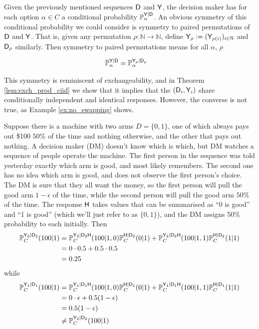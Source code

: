 Given the previously mentioned sequences $\mathsf{D}$ and $\mathsf{Y}$, the decision maker has for each option $\alpha\in C$ a conditional probability $\mathbb{P}_\alpha^{\mathsf{Y}|\mathsf{D}}$. An obvious symmetry of this conditional probability we could consider is symmetry to paired permutations of $\mathsf{D}$ and $\mathsf{Y}$. That is, given any permutation $\rho:\mathbb{N}\to \mathbb{N}$, define $\mathsf{Y}_\rho:=(\mathsf{Y}_{\rho(i)})_{i\in\mathbb{N}}$ and $\mathsf{D}_{\rho}$ similarly. Then symmetry to paired permutations means for all $\alpha$, $\rho$

\begin{align}
    \mathbb{P}_\alpha^{\mathsf{Y}|\mathsf{D}} &= \mathbb{P}_\alpha^{\mathsf{Y}_\rho|\mathsf{D}_\rho}
\end{align}

This symmetry is reminiscent of exchangeability, and in Theorem \ref{lem:exch_prod_ciid} we show that it implies that the $(\mathsf{D}_i,\mathsf{Y}_i)$ share conditionally independent and identical responses. However, the converse is not true, as Example \ref{ex:no_swapping} shows.

\begin{example}\label{ex:no_swapping}
Suppose there is a machine with two arms $D=\{0,1\}$, one of which always pays out \$100 $50\%$ of the time and nothing otherwise, and the other that pays out nothing. A decision maker (DM) doesn't know which is which, but DM watches a sequence of people operate the machine. The first person in the sequence was told yesterday exactly which arm is good, and most likely remembers. The second one has no idea which arm is good, and does not observe the first person's choice. The DM is sure that they all want the money, so the first person will pull the good arm $1-\epsilon$ of the time, while the second person will pull the good arm $50\%$ of the time. The response $\mathsf{H}$ takes values that can be summarised as ``0 is good'' and ``1 is good'' (which we'll just refer to as $\{0,1\}$), and the DM assigns 50\% probability to each initially. Then
\begin{align}
    \mathbb{P}_C^{\mathsf{Y}_2|\mathsf{D}_2}(100|1) &= \mathbb{P}_C^{\mathsf{Y}_2|\mathsf{D}_2\mathsf{H}}(100|1,0)\mathbb{P}_C^{\mathsf{H}|\mathsf{D}_2}(0|1) + \mathbb{P}_C^{\mathsf{Y}_2|\mathsf{D}_2\mathsf{H}}(100|1,1)\mathbb{P}_C^{\mathsf{H}|\mathsf{D}_2}(1|1)\\
    &= 0\cdot 0.5 + 0.5\cdot 0.5\\
    &= 0.25
\end{align}
while
\begin{align}
    \mathbb{P}_C^{\mathsf{Y}_1|\mathsf{D}_1}(100|1) &= \mathbb{P}_C^{\mathsf{Y}_1|\mathsf{D}_1\mathsf{H}}(100|1,0)\mathbb{P}_C^{\mathsf{H}|\mathsf{D}_1}(0|1) + \mathbb{P}_C^{\mathsf{Y}_1|\mathsf{D}_1\mathsf{H}}(100|1,1)\mathbb{P}_C^{\mathsf{H}|\mathsf{D}_1}(1|1)\\
    &= 0\cdot\epsilon + 0.5 (1-\epsilon)\\
    &= 0.5(1-\epsilon)\\
    &\neq \mathbb{P}_C^{\mathsf{Y}_2|\mathsf{D}_2}(100|1)
\end{align}

\end{example}

